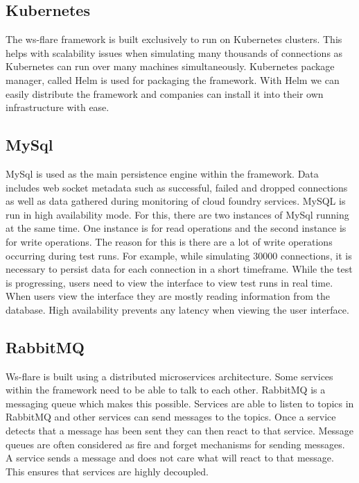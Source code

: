 \subsection{Kubernetes}

The ws-flare framework is built exclusively to run on Kubernetes clusters. This helps with scalability issues when simulating many thousands of connections as Kubernetes can run over many machines simultaneously. Kubernetes package manager, called Helm \cite{helm} is used for packaging the framework. With Helm we can easily distribute the framework and companies can install it into their own infrastructure with ease.

\subsection{MySql}

MySql is used as the main persistence engine within the framework. Data includes web socket metadata such as successful, failed and dropped connections as well as data gathered during monitoring of cloud foundry services. MySQL is run in high availability mode. For this, there are two instances of MySql running at the same time. One instance is for read operations and the second instance is for write operations. The reason for this is there are a lot of write operations occurring during test runs. For example, while simulating 30000 connections, it is necessary to persist data for each connection in a short timeframe. While the test is progressing, users need to view the interface to view test runs in real time. When users view the interface they are mostly reading information from the database. High availability prevents any latency when viewing the user interface.

\subsection{RabbitMQ}

Ws-flare is built using a distributed microservices architecture. Some services within the framework need to be able to talk to each other. RabbitMQ is a messaging queue which makes this possible. Services are able to listen to topics in RabbitMQ and other services can send messages to the topics. Once a service detects that a message has been sent they can then react to that service. Message queues are often considered as fire and forget mechanisms for sending messages. A service sends a message and does not care what will react to that message. This ensures that services are highly decoupled.


